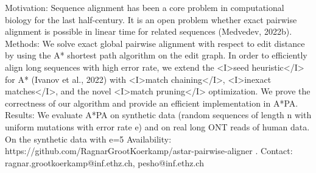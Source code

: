 Motivation: Sequence alignment has been a core problem in computational biology for the last half-century. It is an open problem whether exact pairwise alignment is possible in linear time for related sequences (Medvedev, 2022b).
Methods: We solve exact global pairwise alignment with respect to edit distance by using the A* shortest path algorithm on the edit graph. In order to efficiently align long sequences with high error rate, we extend the <I>seed heuristic</I> for A* (Ivanov et al., 2022) with <I>match chaining</I>, <I>inexact matches</I>, and the novel <I>match pruning</I> optimization. We prove the correctness of our algorithm and provide an efficient implementation in A*PA.
Results: We evaluate A*PA on synthetic data (random sequences of length n with uniform mutations with error rate e) and on real long ONT reads of human data. On the synthetic data with e=5%
Availability: https://github.com/RagnarGrootKoerkamp/astar-pairwise-aligner .
Contact: ragnar.grootkoerkamp@inf.ethz.ch, pesho@inf.ethz.ch